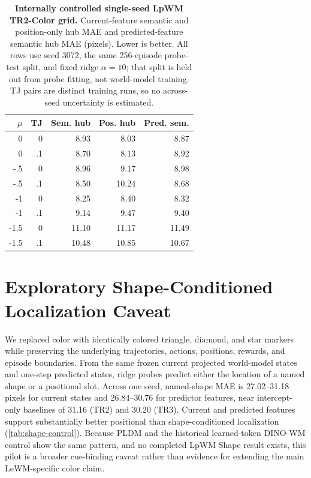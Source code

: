 \documentclass{article}
\begin{document}
\begin{table}[h]
\centering
\scriptsize
\setlength{\tabcolsep}{3.1pt}
\begin{tabular}{@{}rrrrr@{}}
\toprule
$\mu$ & TJ & Sem. hub & Pos. hub & Pred. sem. \\
\midrule
0 & 0 & 8.93 & 8.03 & 8.87 \\
0 & .1 & 8.70 & 8.13 & 8.92 \\
-.5 & 0 & 8.96 & 9.17 & 8.98 \\
-.5 & .1 & 8.50 & 10.24 & 8.68 \\
-1 & 0 & 8.25 & 8.40 & 8.32 \\
-1 & .1 & 9.14 & 9.47 & 9.40 \\
-1.5 & 0 & 11.10 & 11.17 & 11.49 \\
-1.5 & .1 & 10.48 & 10.85 & 10.67 \\
\bottomrule
\end{tabular}
\caption{\textbf{Internally controlled single-seed LpWM TR2-Color grid.} Current-feature semantic and
position-only hub MAE and predicted-feature semantic hub MAE (pixels).  Lower
is better.  All rows use seed 3072, the same 256-episode probe-test split, and
fixed ridge $\alpha=10$; that split is held out from probe fitting, not
world-model training.  TJ pairs are distinct training runs, so no across-seed
uncertainty is estimated.}
\label{tab:lpwm-tj}
\end{table}

\section{Exploratory Shape-Conditioned Localization Caveat}

We replaced color with identically colored triangle, diamond, and star markers
while preserving the underlying trajectories, actions, positions, rewards, and
episode boundaries.  From the same frozen current projected world-model states
and one-step predicted states, ridge probes predict either the location of a
named shape or a positional slot.  Across one seed, named-shape MAE is
27.02--31.18 pixels for current states and
26.84--30.76 for predictor features, near intercept-only baselines of 31.16
(TR2) and 30.20 (TR3).  Current and predicted features support substantially
better positional than shape-conditioned localization
(\cref{tab:shape-control}).  Because PLDM and the historical learned-token
DINO-WM control show the same pattern, and no completed LpWM Shape result exists, this pilot
is a broader cue-binding caveat rather than evidence for extending the main
LeWM-specific color claim.
\end{document}
